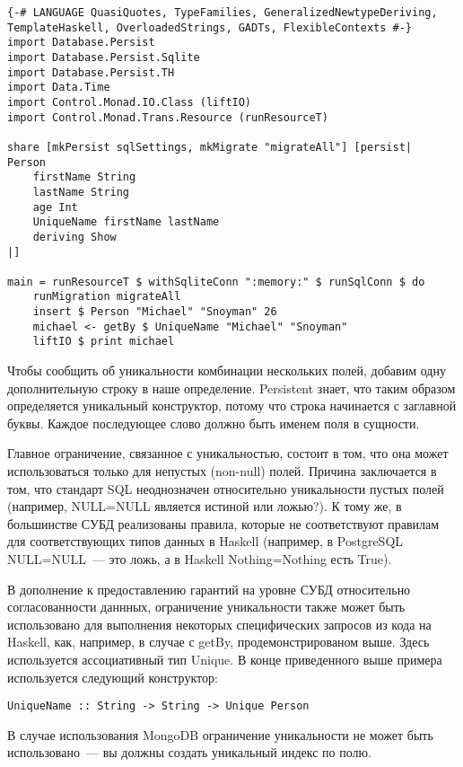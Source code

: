 \begin{lstlisting}
{-# LANGUAGE QuasiQuotes, TypeFamilies, GeneralizedNewtypeDeriving, TemplateHaskell, OverloadedStrings, GADTs, FlexibleContexts #-}
import Database.Persist
import Database.Persist.Sqlite
import Database.Persist.TH
import Data.Time
import Control.Monad.IO.Class (liftIO)
import Control.Monad.Trans.Resource (runResourceT)

share [mkPersist sqlSettings, mkMigrate "migrateAll"] [persist|
Person
    firstName String
    lastName String
    age Int
    UniqueName firstName lastName
    deriving Show
|]

main = runResourceT $ withSqliteConn ":memory:" $ runSqlConn $ do
    runMigration migrateAll
    insert $ Person "Michael" "Snoyman" 26
    michael <- getBy $ UniqueName "Michael" "Snoyman"
    liftIO $ print michael
\end{lstlisting}%

Чтобы сообщить об уникальности комбинации нескольких полей, добавим одну дополнительную строку в наше определение. Persistent знает, что таким образом определяется уникальный конструктор, потому что строка начинается с заглавной буквы. Каждое последующее слово должно быть именем поля в сущности.

Главное ограничение, связанное с уникальностью, состоит в том, что она может использоваться только для непустых (non-null) полей. Причина заключается в том, что стандарт SQL неоднозначен относительно уникальности пустых полей (например, NULL=NULL является истиной или ложью?). К тому же, в большинстве СУБД реализованы правила, которые не соответствуют правилам для соответствующих типов данных в Haskell (например, в PostgreSQL NULL=NULL~--- это ложь, а в Haskell Nothing=Nothing есть True).

В дополнение к предоставлению гарантий на уровне СУБД относительно согласованности даннных, ограничение уникальности также может быть использовано для выполнения некоторых специфических запросов из кода на Haskell, как, например, в случае с getBy, продемонстрированом выше. Здесь используется ассоциативный тип Unique. В конце приведенного выше примера используется следующий конструктор:

\begin{lstlisting}
UniqueName :: String -> String -> Unique Person
\end{lstlisting}

\begin{remark}
В случае использования MongoDB ограничение уникальности не может быть использовано~--- вы должны создать уникальный индекс по полю.
\end{remark}

